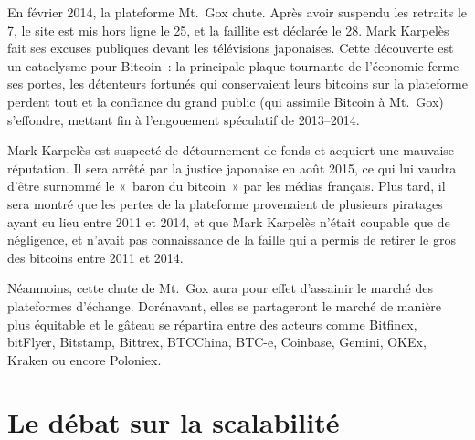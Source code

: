 En février 2014, la plateforme Mt.~Gox chute. Après avoir suspendu les retraits le 7, le site est mis hors ligne le 25, et la faillite est déclarée le 28. Mark Karpelès fait ses excuses publiques devant les télévisions japonaises. Cette découverte est un cataclysme pour Bitcoin~: la principale plaque tournante de l'économie ferme ses portes, les détenteurs fortunés qui conservaient leurs bitcoins sur la plateforme perdent tout et la confiance du grand public (qui assimile Bitcoin à Mt.~Gox) s'effondre, mettant fin à l'engouement spéculatif de 2013--2014.

Mark Karpelès est suspecté de détournement de fonds et acquiert une mauvaise réputation. Il sera arrêté par la justice japonaise en août 2015, ce qui lui vaudra d'être surnommé le «~baron du bitcoin~» par les médias français. Plus tard, il sera montré que les pertes de la plateforme provenaient de plusieurs piratages ayant eu lieu entre 2011 et 2014, et que Mark Karpelès n'était coupable que de négligence, et n'avait pas connaissance de la faille qui a permis de retirer le gros des bitcoins entre 2011 et 2014. %

Néanmoins, cette chute de Mt.~Gox aura pour effet d'assainir le marché des plateformes d'échange. Dorénavant, elles se partageront le marché de manière plus équitable et le gâteau se répartira entre des acteurs comme Bitfinex, bitFlyer, Bitstamp, Bittrex, BTCChina, BTC-e, Coinbase, Gemini, OKEx, Kraken ou encore Poloniex.

\section*{Le débat sur la scalabilité} %

